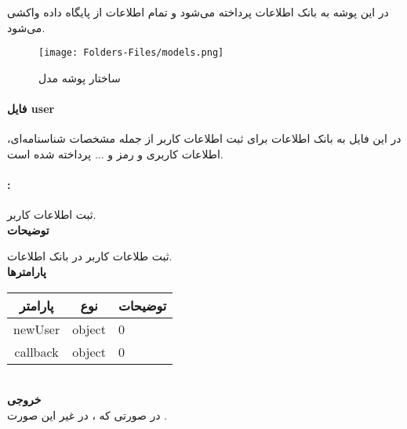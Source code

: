 در این پوشه به بانک اطلاعات پرداخته می‌شود و تمام اطلاعات از پایگاه داده واکشی می‌شود.

\begin{figure}[H]
	\texttt{[image: Folders-Files/models.png]}
	\centering
	\caption{ساختار پوشه مدل}
	\label{fig:folder-models}
\end{figure}

\paragraph{فایل user}
در این فایل به بانک اطلاعات برای ثبت اطلاعات کاربر از جمله مشخصات شناسنامه‌ای، اطلاعات کاربری و رمز و ... پرداخته شده است.

\paragraph{:}
ثبت اطلاعات کاربر.
\\
\textbf{توضیحات}
\hr
\begin{flushleft}
	\framebox[.9\textwidth][l]{
		\lr{
			\textcolor{type}{void}
			\textcolor{func}{setUser}
			\textcolor{symb}{(}
			\textcolor{type}{object}
			\textcolor{arg}{newUser}
			\textcolor{symb}{,}
			\textcolor{type}{object}
			\textcolor{arg}{callback}
			\textcolor{symb}{);}
		}
	}
\end{flushleft}
ثبت طلاعات کاربر در بانک اطلاعات.
\\
\textbf{پارامترها}
\hr \\[10pt]
\begin{tabular}{|m{4cm}|m{3cm}|m{10cm}|}
	\hline
	\multicolumn{1}{|c}{پارامتر}
	&
	\multicolumn{1}{|c}{نوع}
	&
	\multicolumn{1}{|c|}{توضیحات}
	\\
	\hline
	\multicolumn{1}{|c}{newUser}
	&
	\multicolumn{1}{|c|}{object}
	&
	0
	\\
	\hline
	\multicolumn{1}{|c}{callback}
	&
	\multicolumn{1}{|c|}{object}
	&
	0
	\\
	\hline
\end{tabular}
\\[10pt]
\textbf{خروجی}
\hr \\
در صورتی که ، در غیر این صورت .


